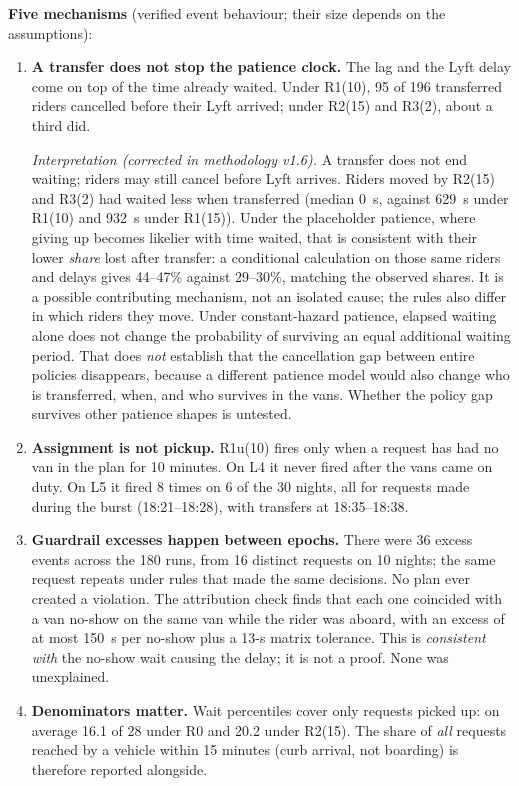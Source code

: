 \documentclass[11pt,letterpaper]{article}
\begin{document}
\textbf{Five mechanisms} (verified event behaviour; their size depends on the assumptions):
\begin{enumerate}
\item \textbf{A transfer does not stop the patience clock.} The lag and the Lyft delay come on top of the time already waited. Under R1(10), 95 of 196 transferred riders cancelled before their Lyft arrived; under R2(15) and R3(2), about a third did.

\emph{Interpretation (corrected in methodology v1.6).} A transfer does not end waiting; riders may still cancel before Lyft arrives. Riders moved by R2(15) and R3(2) had waited less when transferred (median 0~s, against 629~s under R1(10) and 932~s under R1(15)). Under the placeholder patience, where giving up becomes likelier with time waited, that is consistent with their lower \emph{share} lost after transfer: a conditional calculation on those same riders and delays gives 44--47\% against 29--30\%, matching the observed shares. It is a possible contributing mechanism, not an isolated cause; the rules also differ in which riders they move. Under constant-hazard patience, elapsed waiting alone does not change the probability of surviving an equal additional waiting period. That does \emph{not} establish that the cancellation gap between entire policies disappears, because a different patience model would also change who is transferred, when, and who survives in the vans. Whether the policy gap survives other patience shapes is untested.
\item \textbf{Assignment is not pickup.} R1u(10) fires only when a request has had no van in the plan for 10 minutes. On L4 it never fired after the vans came on duty. On L5 it fired 8 times on 6 of the 30 nights, all for requests made during the burst (18:21--18:28), with transfers at 18:35--18:38.
\item \textbf{Guardrail excesses happen between epochs.} There were 36 excess events across the 180 runs, from 16 distinct requests on 10 nights; the same request repeats under rules that made the same decisions. No plan ever created a violation. The attribution check finds that each one coincided with a van no-show on the same van while the rider was aboard, with an excess of at most 150~s per no-show plus a 13-s matrix tolerance. This is \emph{consistent with} the no-show wait causing the delay; it is not a proof. None was unexplained.
\item \textbf{Denominators matter.} Wait percentiles cover only requests picked up: on average 16.1 of 28 under R0 and 20.2 under R2(15). The share of \emph{all} requests reached by a vehicle within 15 minutes (curb arrival, not boarding) is therefore reported alongside.

\end{enumerate}
\end{document}
